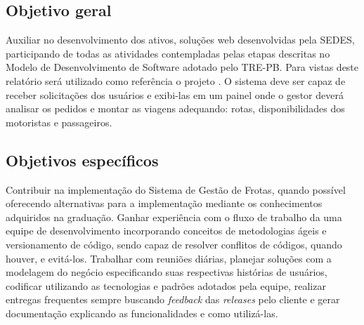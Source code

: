 \subsection{Objetivo geral}
\label{sec:objetivoGeral}
Auxiliar no desenvolvimento dos ativos, soluções web desenvolvidas pela SEDES, participando de todas as atividades contempladas pelas etapas descritas no Modelo de Desenvolvimento de Software adotado pelo TRE-PB.  Para vistas deste relatório será utilizado como referência o projeto \imprimirtitulo. O sistema deve ser capaz de receber solicitações dos usuários e exibi-las em um painel onde o gestor deverá analisar os pedidos e montar as viagens adequando: rotas, disponibilidades dos motoristas e passageiros.

\subsection{Objetivos específicos}
\label{sec:objetivosEspecificos}
Contribuir na implementação do Sistema de Gestão de Frotas, quando possível oferecendo alternativas para a implementação mediante os conhecimentos adquiridos na graduação. Ganhar experiência com o fluxo de trabalho da uma equipe de desenvolvimento incorporando conceitos de metodologias ágeis e versionamento de código, sendo capaz de resolver conflitos de códigos, quando houver, e evitá-los. Trabalhar com reuniões diárias, planejar soluções com a modelagem do negócio especificando suas respectivas histórias de usuários, codificar utilizando as tecnologias e padrões adotados pela equipe, realizar entregas frequentes sempre buscando \textit{feedback} das \textit{releases} pelo cliente e gerar documentação explicando as funcionalidades e como utilizá-las. 


